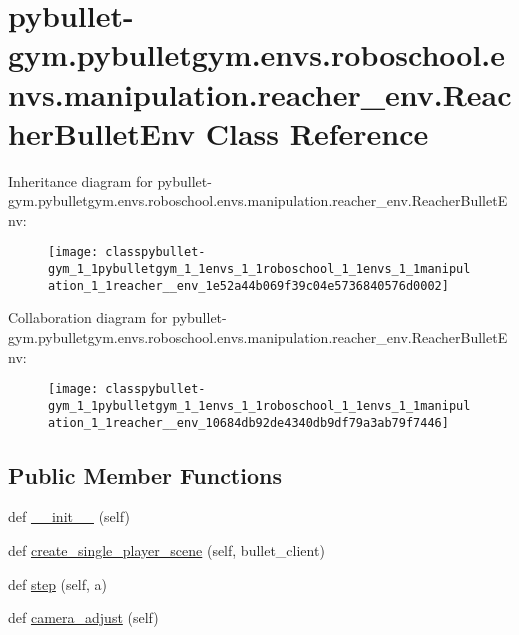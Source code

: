 \hypertarget{classpybullet-gym_1_1pybulletgym_1_1envs_1_1roboschool_1_1envs_1_1manipulation_1_1reacher__env_1_1_reacher_bullet_env}{}\section{pybullet-\/gym.pybulletgym.\+envs.\+roboschool.\+envs.\+manipulation.\+reacher\+\_\+env.\+Reacher\+Bullet\+Env Class Reference}
\label{classpybullet-gym_1_1pybulletgym_1_1envs_1_1roboschool_1_1envs_1_1manipulation_1_1reacher__env_1_1_reacher_bullet_env}


Inheritance diagram for pybullet-\/gym.pybulletgym.\+envs.\+roboschool.\+envs.\+manipulation.\+reacher\+\_\+env.\+Reacher\+Bullet\+Env\+:
\nopagebreak
\begin{figure}[H]
\begin{center}
\leavevmode
\texttt{[image: classpybullet-gym\_1\_1pybulletgym\_1\_1envs\_1\_1roboschool\_1\_1envs\_1\_1manipulation\_1\_1reacher\_\_env\_1e52a44b069f39c04e5736840576d0002]}
\end{center}
\end{figure}


Collaboration diagram for pybullet-\/gym.pybulletgym.\+envs.\+roboschool.\+envs.\+manipulation.\+reacher\+\_\+env.\+Reacher\+Bullet\+Env\+:
\nopagebreak
\begin{figure}[H]
\begin{center}
\leavevmode
\texttt{[image: classpybullet-gym\_1\_1pybulletgym\_1\_1envs\_1\_1roboschool\_1\_1envs\_1\_1manipulation\_1\_1reacher\_\_env\_10684db92de4340db9df79a3ab79f7446]}
\end{center}
\end{figure}
\subsection*{Public Member Functions}
\begin{DoxyCompactItemize}
\item 
def \hyperlink{classpybullet-gym_1_1pybulletgym_1_1envs_1_1roboschool_1_1envs_1_1manipulation_1_1reacher__env_1_1_reacher_bullet_env_aeb57bb128ba757399920d5e178719f96}{\+\_\+\+\_\+init\+\_\+\+\_\+} (self)
\item 
def \hyperlink{classpybullet-gym_1_1pybulletgym_1_1envs_1_1roboschool_1_1envs_1_1manipulation_1_1reacher__env_1_1_reacher_bullet_env_a1923b869f38441f425413ad342913982}{create\+\_\+single\+\_\+player\+\_\+scene} (self, bullet\+\_\+client)
\item 
def \hyperlink{classpybullet-gym_1_1pybulletgym_1_1envs_1_1roboschool_1_1envs_1_1manipulation_1_1reacher__env_1_1_reacher_bullet_env_ab0c0a73de331d65dbcf95e6459a768b8}{step} (self, a)
\item 
def \hyperlink{classpybullet-gym_1_1pybulletgym_1_1envs_1_1roboschool_1_1envs_1_1manipulation_1_1reacher__env_1_1_reacher_bullet_env_a202f5822212dd8190b668ccccd91d384}{camera\+\_\+adjust} (self)
\end{DoxyCompactItemize}
